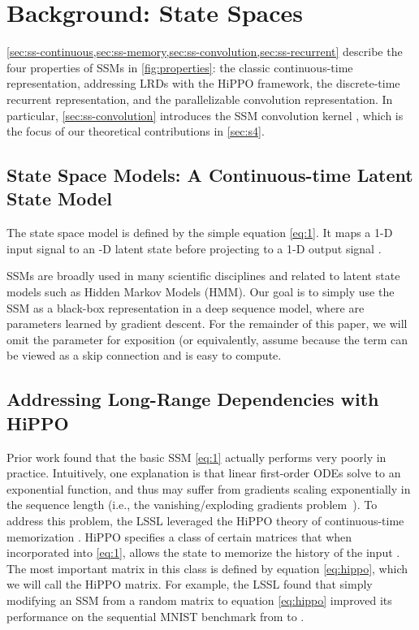 \documentclass{article}
\begin{document}
 

\section{Background: State Spaces}
\label{sec:background}

\cref{sec:ss-continuous,sec:ss-memory,sec:ss-convolution,sec:ss-recurrent} describe the four properties of SSMs in \cref{fig:properties}:
the classic continuous-time representation, addressing LRDs with the HiPPO framework, the discrete-time recurrent representation, and the parallelizable convolution representation.
In particular, \cref{sec:ss-convolution} introduces the SSM convolution kernel ,
which is
the focus of our theoretical contributions in \cref{sec:s4}.

\subsection{State Space Models: A Continuous-time Latent State Model}
\label{sec:ss-continuous}

The state space model is defined by the simple equation \eqref{eq:1}.
It maps a 1-D input signal  to an -D latent state 
before projecting to a 1-D output signal .

SSMs are broadly used in many scientific disciplines
and related to latent state models such as Hidden Markov Models (HMM).
Our goal is to simply use the SSM as a black-box representation in a deep sequence model,
where  are parameters learned by gradient descent.
For the remainder of this paper, we will omit the parameter  for exposition (or equivalently, assume  because the term  can be viewed as a skip connection and is easy to compute.

\subsection{Addressing Long-Range Dependencies with HiPPO}
\label{sec:ss-memory}



Prior work found that the basic SSM \eqref{eq:1} actually performs very poorly in practice.
Intuitively, one explanation is that linear first-order ODEs solve to an exponential function,
and thus may suffer from gradients scaling exponentially in the sequence length (i.e., the vanishing/exploding gradients problem~\citep{pascanu2013difficulty}).
To address this problem, the LSSL leveraged the HiPPO theory of continuous-time memorization \citep{gu2020hippo}.
HiPPO specifies a class of certain matrices  that when incorporated into \eqref{eq:1}, allows the state  to memorize the history of the input .
The most important matrix in this class is defined by equation \eqref{eq:hippo},
which we will call the HiPPO matrix. For example, the LSSL found that simply modifying an SSM from a random matrix  to equation \eqref{eq:hippo} improved its performance on the sequential MNIST benchmark from  to .
\end{document}
